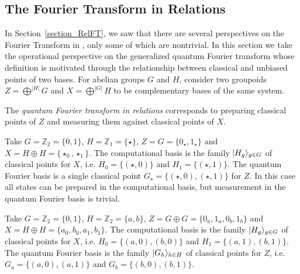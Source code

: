 \subsection{The Fourier Transform in Relations}
\label{sec:RelFT}

In Section~\ref{section_RelFT}, we saw that there are several perspectives on the Fourier Transform in , only some of which are nontrivial. In this section we take the operational perspective on the generalized quantum Fourier transform whose definition is motivated through the relationship between classical and unbiased points of two bases.  For abelian groups $G$ and $H$, consider two groupoids $Z=\bigoplus^{|H|}G$ and $X=\bigoplus^{|G|}H$ to be complementary bases of the same system.

\begin{defn}
\label{def:FTRel}
The \emph{quantum Fourier transform in relations} corresponds to preparing classical points of $Z$ and measuring them against classical points of $X$.
\end{defn}

\begin{example}
Take $G=\mathbb{Z}_2=\{0,1\}$, $H=\mathbb{Z}_1=\{\star\}$, $Z = G = \{ 0_\star,1_\star \}$ and $X=H\oplus H = \{ \star_0,\star_1 \}$. The computational basis is the family $| H_g \rangle_{g\in G}$ of classical points for $X$, i.e. $H_0 = \{(\star,0)\}$ and $H_1 = \{(\star,1)\}$. The quantum Fourier basis is a single classical point $G_\star = \{(\star,0), (\star,1)\}$ for $Z$. In this case all states can be prepared in the computational basis, but  measurement in the quantum Fourier basis is trivial.
\end{example}

\begin{example}
Take $G=\mathbb{Z}_2=\{0,1\}$, $H=\mathbb{Z}_2=\{a,b\}$, $Z = G \oplus G = \{ 0_a,1_a,0_b,1_b\}$ and $X= H \oplus H = \{ a_0, b_0, a_1, b_1 \}$. The computational basis is the family $| H_g \rangle_{g \in G}$ of classical points for $X$, i.e. $H_0 = \{(a,0),(b,0)\}$ and $H_1 = \{(a,1),(b,1)\}$. The quantum Fourier basis is the family $| G_h \rangle_{h\in H}$ of classical points for $Z$, i.e. $G_a = \{(a,0),(a,1)\}$ and $G_b = \{(b,0),(b,1)\}$.
\end{example}

